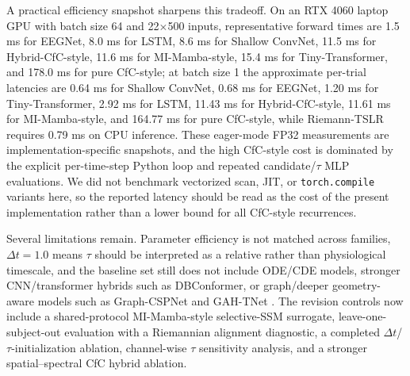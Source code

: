 \documentclass[journal]{IEEEtran}
\begin{document}
A practical efficiency snapshot sharpens this tradeoff. On an RTX 4060 laptop GPU with batch size 64 and 22$\times$500 inputs, representative forward times are 1.5 ms for EEGNet, 8.0 ms for LSTM, 8.6 ms for Shallow ConvNet, 11.5 ms for Hybrid-CfC-style, 11.6 ms for MI-Mamba-style, 15.4 ms for Tiny-Transformer, and 178.0 ms for pure CfC-style; at batch size 1 the approximate per-trial latencies are 0.64 ms for Shallow ConvNet, 0.68 ms for EEGNet, 1.20 ms for Tiny-Transformer, 2.92 ms for LSTM, 11.43 ms for Hybrid-CfC-style, 11.61 ms for MI-Mamba-style, and 164.77 ms for pure CfC-style, while Riemann-TSLR requires 0.79 ms on CPU inference. These eager-mode FP32 measurements are implementation-specific snapshots, and the high CfC-style cost is dominated by the explicit per-time-step Python loop and repeated candidate/$\tau$ MLP evaluations. We did not benchmark vectorized scan, JIT, or \texttt{torch.compile} variants here, so the reported latency should be read as the cost of the present implementation rather than a lower bound for all CfC-style recurrences.

Several limitations remain. Parameter efficiency is not matched across families, $\Delta t=1.0$ means $\tau$ should be interpreted as a relative rather than physiological timescale, and the baseline set still does not include ODE/CDE models, stronger CNN/transformer hybrids such as DBConformer, or graph/deeper geometry-aware models such as Graph-CSPNet and GAH-TNet \cite{gu2023mamba,wang2025eegmamba,guo2025mimamba,wang2025dbconformer,ingolfsson2020eegtcnet,elouahidi2024simpleconv,li2024ctnet,han2024eegcct,ju2022graphcspnet,han2025gahtnet}. The revision controls now include a shared-protocol MI-Mamba-style selective-SSM surrogate, leave-one-subject-out evaluation with a Riemannian alignment diagnostic, a completed $\Delta t$/$\tau$-initialization ablation, channel-wise $\tau$ sensitivity analysis, and a stronger spatial--spectral CfC hybrid ablation.
\end{document}
